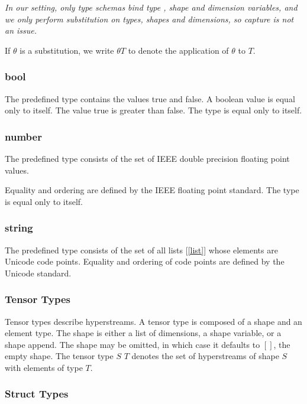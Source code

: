 \documentclass{article}
\begin{document}
{  {\em 
  In our setting, only type schemas bind type , shape and dimension variables, and we only perform substitution on types, shapes and dimensions, so capture is not an issue.
  }
  
If $\theta$ is a substitution, we write $\theta T$ to denote the application of $\theta$ to $T$.

\subsubsection{bool}
\label{bool}

The predefined type \BOOL{} contains the values true and false.  A boolean value is equal only to itself. The value true is greater than false. The type \BOOL{} is equal only to itself.

\subsubsection{number}
\label{number}

 The predefined type \NUMBER{} consists of the set of IEEE double precision floating point values.
 
 Equality and ordering are defined by the IEEE floating point standard. The type \NUMBER{} is equal only to itself.
 
\subsubsection{string}
\label{string}

The predefined type \STRING{} consists of the set of all lists [\ref{list}] whose elements are Unicode code points. Equality and ordering of code points are defined by the Unicode standard. 

\subsubsection{Tensor Types}
\label{tensorTypes}

Tensor types describe hyperstreams. A tensor type is composed of a shape and an element type. The shape is either a list of dimensions, a shape variable, or a shape append. The shape may be omitted, in which case it defaults to $[]$, the empty shape. The tensor type $S$ $T$ denotes the set of hyperstreams of shape $S$ with elements of type $T$.


\subsubsection{Struct Types}
\label{structTypes}

}
\end{document}
